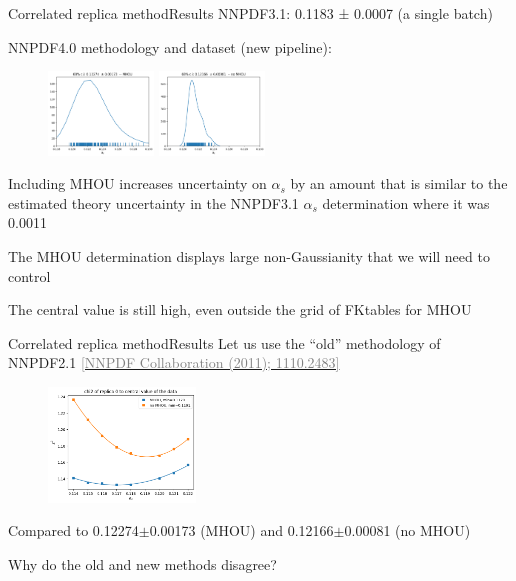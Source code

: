 \documentclass[aspectratio=169, 8pt,t]{beamer}
\begin{document}
\begin{frame}{Correlated replica method}{Results}
  NNPDF3.1: 0.1183 ± 0.0007 (a single batch)

  \vspace*{1em}
  NNPDF4.0 methodology and dataset (new pipeline):
  \begin{figure}
    \includegraphics[width=0.25\textwidth]{withmhou_kdeplot.png}
    \includegraphics[width=0.25\textwidth]{nomhou_kdeplot.png}
  \end{figure}
  Including MHOU increases uncertainty on $\alpha_s$ by an amount that is similar to the estimated theory uncertainty in the NNPDF3.1 $\alpha_s$ determination where it was 0.0011

  \vspace*{0.5em}
  The MHOU determination displays large non-Gaussianity that we will need to control

  \vspace*{0.5em}
  The central value is still high, even outside the grid of FKtables for MHOU
\end{frame}


\begin{frame}{Correlated replica method}{Results}
  Let us use the ``old'' methodology of NNPDF2.1 \href{https://arxiv.org/abs/1110.2483}{\textcolor{gray}{[NNPDF Collaboration (2011); 1110.2483]}}

  \begin{figure}
    \includegraphics[width=0.35\textwidth]{naivechi2fit.png}
  \end{figure}
  \centering
  Compared to 0.12274$\pm$0.00173 (MHOU) and 0.12166$\pm$0.00081 (no MHOU)

  \vspace*{0.5em}
  Why do the old and new methods disagree?
\end{frame}
\end{document}
